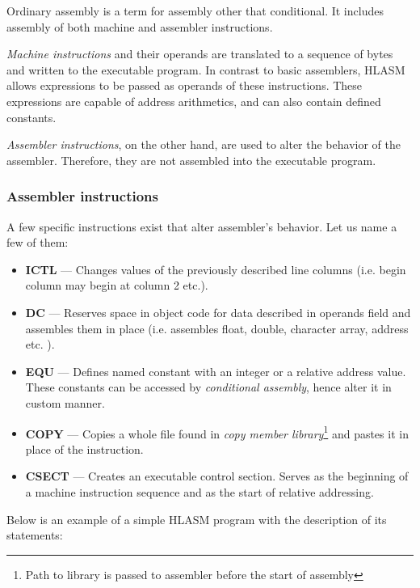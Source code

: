 Ordinary assembly is a term for assembly other that conditional. It includes assembly of both machine and assembler instructions. 

\emph{Machine instructions} and their operands are translated to a sequence of bytes and written to the executable program. In contrast to basic assemblers, HLASM allows expressions to be passed as operands of these instructions. These expressions are capable of address arithmetics, and can also contain defined constants.

\emph{Assembler instructions}, on the other hand, are used to alter the behavior of the assembler. Therefore, they are not assembled into the executable program.

\subsubsection{Assembler instructions}

A few specific instructions exist that alter assembler's behavior. Let us name a few of them:
\begin{itemize}
	\item \textbf{ICTL} --- Changes values of the previously described line columns (i.e. begin column may begin at column 2 etc.).
	
	\item \textbf{DC} --- Reserves space in object code for data described in operands field and assembles them in place (i.e. assembles float, double, character array, address etc. ).
	
	\item \textbf{EQU} --- Defines named constant with an integer or a relative address value. These constants can be accessed by \textit{conditional assembly}, hence alter it in custom manner.
	
	\item \textbf{COPY} --- Copies a whole file found in \textit{copy member library}\footnote{Path to library is passed to assembler before the start of assembly} and pastes it in place of the instruction.
	
	\item \textbf{CSECT} --- Creates an executable control section. Serves as the beginning of a machine instruction sequence and as the start of relative addressing.
\end{itemize}

Below is an example of a simple HLASM program with the description of its statements:

